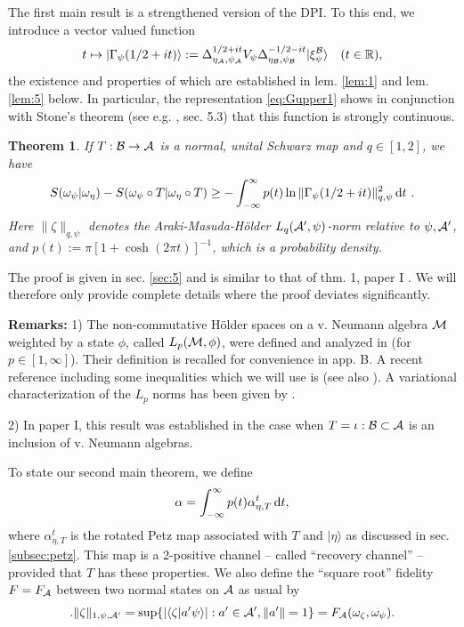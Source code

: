 \documentclass[english,a4paper,12pt]{article}
\newtheorem{theorem}{Theorem}
\def\cA{{\mathfrak A}}
\def\cB{{\mathfrak B}}
\def\cM{{\mathfrak M}}
\newcommand{\ca}[1]{{\cal #1}}
\newcommand{\ben}{\begin{equation}}
\newcommand{\een}{\end{equation}}
\def\cA{{\ca A}}
\def\cB{{\ca B}}
\def\cM{{\ca M}}
\newcommand{\dd}{{\rm d}}
\renewcommand{\log}{\operatorname{ln}}
\newcommand{\RR}{\mathbb{R}}
\begin{document}
The first main result is a strengthened 
version of the DPI. To this end, we introduce a vector valued function 
\ben\label{eq:Gupper}
t \mapsto |\Gamma_\psi(1/2+it)\rangle := 
\Delta_{\eta_\cA,\psi_\cA}^{1/2 + it} V_{\psi} \Delta_{\eta_\cB,\psi_\cB}^{-1/2 -it} |\xi_{\psi}^{\cB}\rangle \quad (t\in \RR), 
\een
the existence and properties of which are established in lem. \ref{lem:1} and lem. \ref{lem:5} below. In particular, the representation \eqref{eq:Gupper1}
shows in conjunction with Stone's theorem (see e.g. \cite{specth}, sec. 5.3) that this function is strongly continuous.

\begin{theorem}\label{thm:1}
If $T: \cB \to \cA$ is a normal, unital Schwarz map and $q \in [1,2]$, we have
\ben
\label{eq:main}
S(\omega_\psi | \omega_\eta) - S(\omega_\psi \circ T | \omega_\eta \circ T)
 \ge 
- \int_{-\infty}^\infty p(t) \log \| \Gamma_\psi(1/2+it)\|_{q,\psi}^2 \, \dd t \ . 
\een
Here $\| \zeta \|_{q,\psi}$ denotes the  Araki-Masuda-H\" older $L_q(\cA', \psi)$-norm relative to $\psi,\cA'$, and 
$p(t) := \pi \left[ 1+\cosh(2\pi t) \right]^{-1}$, which is a probability density. 
\end{theorem}

The proof is given in sec. \ref{sec:5} and is similar to that of thm. 1, paper I  \cite{Faulkner:2020iou}. We will therefore only provide complete details where the proof deviates significantly. 

\medskip
\noindent
{\bf Remarks:}
1) The non-commutative H\" older spaces on a v. Neumann algebra $\cM$ weighted by a state $\phi$, called $L_p(\cM, \phi)$, 
were defined and analyzed in \cite{AM} (for $p \in [1,\infty]$). Their definition is recalled for convenience in app. B. 
A recent reference including some inequalities which we will use is \cite{Berta2} (see also \cite{JencovaLp1}).
A variational characterization of the $L_p$ norms has been given by \cite{Hollands2}.

2) In paper I, this result was established in the case when $T=\iota: \cB \subset \cA$ is an inclusion of v. Neumann algebras.

\medskip
\noindent
To state our second main theorem, we define 
\ben\label{eq:recov}
\alpha =   \int_{-\infty}^\infty p(t) \alpha_{\eta,T}^t \, \dd t, 
\een
where $\alpha_{\eta,T}^t$ is the rotated Petz map associated with $T$ and $|\eta\rangle$ as discussed in sec. \ref{subsec:petz}. This map
is a 2-positive channel -- called ``recovery channel'' -- provided that $T$ has these properties.
We also define the ``square root'' fidelity $F=F_\cA$ between two normal states on $\cA$ as usual by
\ben
 \label{eq:Fchar}. 
\| \zeta \|_{1,\psi,\cA'} = \sup\{ |\langle \zeta | a' \psi \rangle | : a' \in \cA', \|a'\|=1 \} = F_{\cA}(\omega_\zeta, \omega_\psi).
\een
\end{document}
